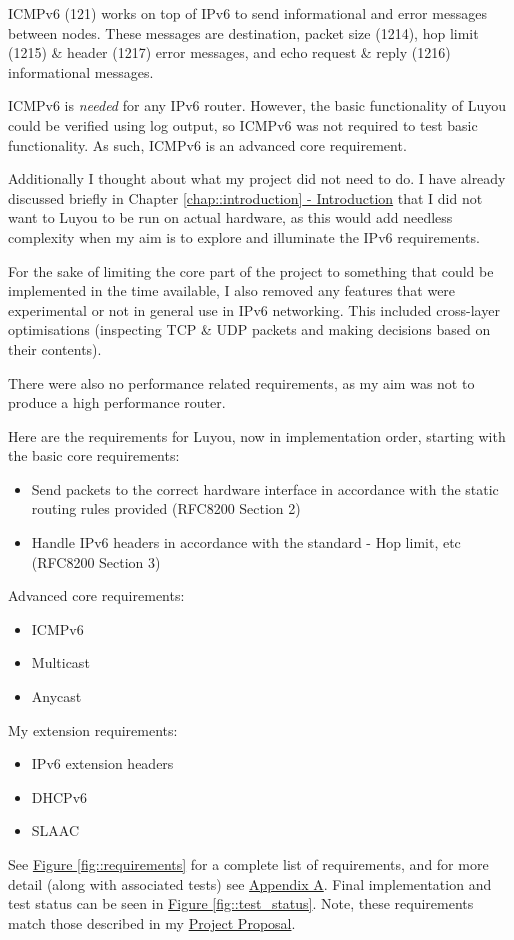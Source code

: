 \documentclass[12pt,a4paper,twoside,openany]{report}
\begin{document}
\bigskip

ICMPv6 (121) works on top of IPv6 to send informational and error messages between nodes.  These messages are destination, packet size (1214), hop limit (1215) \& header (1217) error messages, and echo request \& reply (1216) informational messages. 

ICMPv6 is \textit{needed} for any IPv6 router.  However, the basic functionality of Luyou could be verified using log output, so ICMPv6 was not required to test basic functionality. As such, ICMPv6 is an advanced core requirement.

\bigskip

Additionally I thought about what my project did not need to do. I have already discussed briefly in Chapter \ref{chap::introduction}\hyperref[chap::introduction]{ - Introduction} that I did not want to Luyou to be run on actual hardware, as this would add needless complexity when my aim is to explore and illuminate the IPv6 requirements. 

For the sake of limiting the core part of the project to something that could be implemented in the time available, I also removed any features that were experimental or not in general use in IPv6 networking.  This included cross-layer optimisations (inspecting TCP \& UDP packets and making decisions based on their contents).

There were also no performance related requirements, as my aim was not to produce a high performance router.

\bigskip

Here are the requirements for Luyou, now in implementation order, starting with the basic core requirements:
\begin{itemize}
\item Send packets to the correct hardware interface in accordance with the static routing rules provided (RFC8200 Section 2\cite{ipv6_rfc})
\item Handle IPv6 headers in accordance with the standard - Hop limit, etc (RFC8200 Section 3\cite{ipv6_rfc})
\end{itemize}
Advanced core requirements:
\begin{itemize}
\item ICMPv6\cite{icmpv6_rfc}
\item Multicast\cite{ipv6_rfc_adr}
\item Anycast\cite{ipv6_rfc_adr}
\end{itemize}
My extension requirements:
\begin{itemize}
\item IPv6 extension headers\cite{ipv6_rfc}
\item DHCPv6\cite{dhcpv6_rfc}
\item SLAAC\cite{slaac_rfc}
\end{itemize}
See \hyperref[fig::requirements]{Figure }\ref{fig::requirements} for a complete list of requirements, and for more detail (along with associated tests) see \hyperref[appendix::requirements]{Appendix A}. Final implementation and test status can be seen in  \hyperref[fig::test_status]{Figure }\ref{fig::test_status}. Note, these requirements match those described in my  \hyperref[appendix::proposal]{Project Proposal}.
\end{document}
